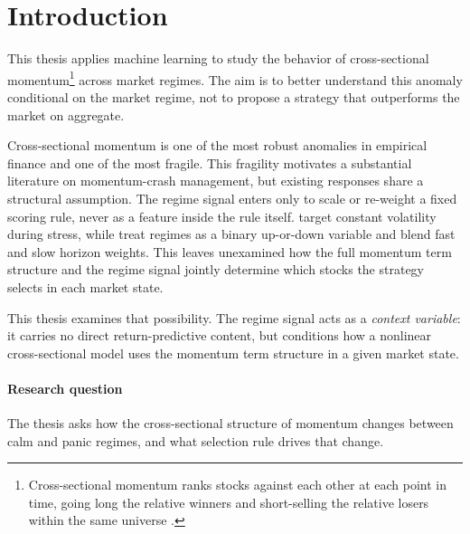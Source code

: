 
\clearpage
\section{Introduction}\label{sec:introduction}

This thesis applies machine learning to study the behavior of cross-sectional momentum\footnote{Cross-sectional momentum ranks stocks against each other at each point in time, going long the relative winners and short-selling the relative losers within the same universe \citep{JegadeeshTitman1993}.} across market regimes. The aim is to better understand this anomaly conditional on the market regime, not to propose a strategy that outperforms the market on aggregate.

Cross-sectional momentum is one of the most robust anomalies in empirical finance and one of the most fragile. This fragility motivates a substantial literature on momentum-crash management, but existing responses share a structural assumption. The regime signal enters only to scale or re-weight a fixed scoring rule, never as a feature inside the rule itself. \citet{BarrosoSantaClara2015} target constant volatility during stress, while \citet{Cooper2004} treat regimes as a binary up-or-down variable and \citet{GHM2023} blend fast and slow horizon weights. This leaves unexamined how the full momentum term structure and the regime signal jointly determine which stocks the strategy selects in each market state.

This thesis examines that possibility. The regime signal acts as a \emph{context variable}: it carries no direct return-predictive content, but conditions how a nonlinear cross-sectional model uses the momentum term structure in a given market state.

\paragraph{Research question} The thesis asks how the cross-sectional structure of momentum changes between calm and panic regimes, and what selection rule drives that change.

